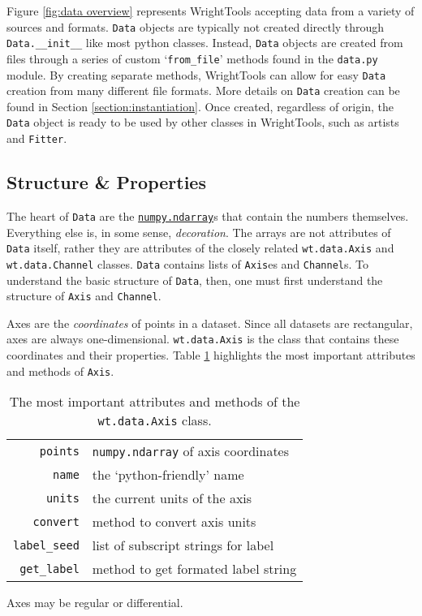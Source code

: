 \documentclass[11pt]{article}
\begin{document}
Figure \ref{fig:data overview} represents WrightTools accepting data from a variety of sources and formats. \texttt{Data} objects are typically not created directly through \texttt{Data.\_\_init\_\_} like most python classes. Instead, \texttt{Data} objects are created from files through a series of custom `\texttt{from\_file}' methods found in the \texttt{data.py} module. By creating separate methods, WrightTools can allow for easy \texttt{Data} creation from many different file formats. More details on \texttt{Data} creation can be found in Section \ref{section:instantiation}. Once created, regardless of origin, the \texttt{Data} object is ready to be used by other classes in WrightTools, such as artists and \texttt{Fitter}.

\subsection{Structure \& Properties}

The heart of \texttt{Data} are the \href{https://docs.scipy.org/doc/numpy/reference/generated/numpy.ndarray.html}{\texttt{numpy.ndarray}}s that contain the numbers themselves. Everything else is, in some sense, \textit{decoration}. The arrays are not attributes of \texttt{Data} itself, rather they are attributes of the closely related \texttt{wt.data.Axis} and \texttt{wt.data.Channel} classes. \texttt{Data} contains lists of \texttt{Axis}es and \texttt{Channel}s. To understand the basic structure of \texttt{Data}, then, one must first understand the structure of \texttt{Axis} and \texttt{Channel}.

Axes are the \textit{coordinates} of points in a dataset. Since all datasets are rectangular, axes are always one-dimensional. \texttt{wt.data.Axis} is the class that contains these coordinates and their properties. Table \ref{tab:axis properties} highlights the most important attributes and methods of \texttt{Axis}.
\begin{table}\label{tab:axis properties}	
	\begin{center}
		\begin{tabular}{r | l}
			\texttt{points} & \texttt{numpy.ndarray} of axis coordinates \\ 
			\texttt{name} & the `python-friendly' name \\ 
			\texttt{units} & the current units of the axis \\ 
			\texttt{convert} & method to convert axis units \\
			\texttt{label\_seed} & list of subscript strings for label \\
			\texttt{get\_label} & method to get formated label string
		\end{tabular}
	\end{center}
	\caption{The most important attributes and methods of the \texttt{wt.data.Axis} class.}
\end{table}
Axes may be regular or differential.
\end{document}
